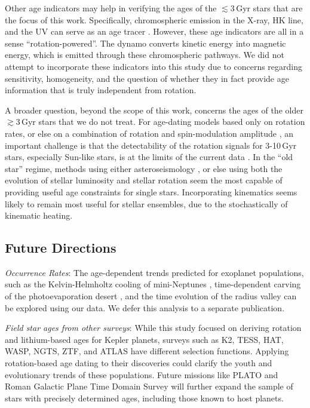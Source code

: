 \documentclass[11pt,twocolumn,tighten]{aastex63}
\begin{document}
Other age indicators may help in verifying the ages of the
$\lesssim$3\,Gyr stars that are the focus of this work.  Specifically,
chromospheric emission in the X-ray,  HK line, and the UV
can serve as an age tracer
\citep{Mamajek_2008,2014MNRAS.441.2361V,2024ApJ...960...62E}.
However, these age indicators are all in a sense ``rotation-powered''.
The dynamo converts kinetic energy into magnetic energy, which is
emitted through these chromospheric pathways.  We did not attempt to
incorporate these indicators into this study due to concerns regarding
sensitivity, homogeneity, and the question of whether they in fact
provide age information that is truly independent from rotation.

A broader question, beyond the scope of this work, concerns the ages
of the older $\gtrsim$3\,Gyr stars that we do not treat.  For
age-dating models based only on rotation rates, or else on a
combination of rotation and spin-modulation amplitude
\citep{2023ApJ...952..131M}, an important challenge is that the
detectability of the rotation signals for 3-10\,Gyr stars, especially
Sun-like stars, is at the limits of the current data
\citep{2022ApJ...937...94M}.  In the ``old star'' regime, methods
using either asteroseismology
\citep{vanSaders_2016,2024ApJ...962..138S}, or else using both the
evolution of stellar luminosity and stellar rotation
\citep{Angus_2019} seem the most capable of providing useful age
constraints for single stars.  Incorporating kinematics
\citep{2021AJ....161..189L} seems likely to remain most useful for
stellar ensembles, due to the stochastically of kinematic heating.


\subsection{Future Directions}

{\it Occurrence Rates}:
The age-dependent trends predicted for exoplanet populations, such as
the Kelvin-Helmholtz cooling of mini-Neptunes \citep{Gupta_2019},
time-dependent carving of the photoevaporation desert
\citep{Owen_Lai_2018}, and the time evolution of the radius valley
\citep{Rogers_2021} can be explored using our data.  We defer this
analysis to a separate publication.

{\it Field star ages from other surveys}:
While this study focused on deriving rotation and lithium-based ages
for Kepler planets, surveys such as K2, TESS, HAT, WASP, NGTS, ZTF, and
ATLAS have different selection functions.
Applying rotation-based age dating to their discoveries could clarify
the youth and evolutionary trends of these populations.  Future
missions like PLATO \citep{Rauer14} and Roman Galactic Plane Time
Domain Survey  will further expand the sample of stars with precisely
determined ages, including those known to host planets.
\end{document}
